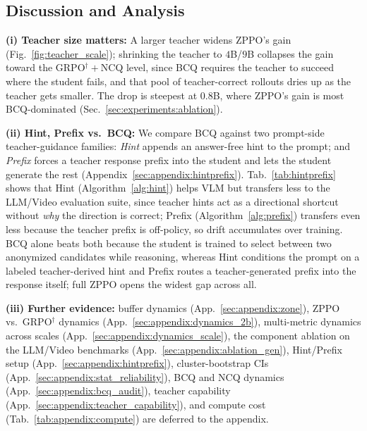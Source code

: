 \subsection{Discussion and Analysis}
\label{sec:experiments:discussion}

\textbf{(i) Teacher size matters:} A larger teacher widens ZPPO's gain (Fig.~\ref{fig:teacher_scale}); shrinking the teacher to $4$B/$9$B collapses the gain toward the GRPO$^{\dagger}\!+\!$NCQ level, since BCQ requires the teacher to succeed where the student fails, and that pool of teacher-correct rollouts dries up as the teacher gets smaller. The drop is steepest at $0.8$B, where ZPPO's gain is most BCQ-dominated (Sec.~\ref{sec:experiments:ablation}).

\textbf{(ii) Hint, Prefix vs.\ BCQ:} We compare BCQ against two prompt-side teacher-guidance families: \emph{Hint} appends an answer-free hint to the prompt; and \emph{Prefix} forces a teacher response prefix into the student and lets the student generate the rest (Appendix~\ref{sec:appendix:hintprefix}). Tab.~\ref{tab:hintprefix} shows that Hint (Algorithm~\ref{alg:hint}) helps VLM but transfers less to the LLM/Video evaluation suite, since teacher hints act as a directional shortcut without \emph{why} the direction is correct; Prefix (Algorithm~\ref{alg:prefix}) transfers even less because the teacher prefix is off-policy, so drift accumulates over training. BCQ alone beats both because the student is trained to select between two anonymized candidates while reasoning, whereas Hint conditions the prompt on a labeled teacher-derived hint and Prefix routes a teacher-generated prefix into the response itself; full ZPPO opens the widest gap across all.

\textbf{(iii) Further evidence:} buffer dynamics (App.~\ref{sec:appendix:zone}), ZPPO vs.\ GRPO$^{\dagger}$ dynamics (App.~\ref{sec:appendix:dynamics_2b}), multi-metric dynamics across scales (App.~\ref{sec:appendix:dynamics_scale}), the component ablation on the LLM/Video benchmarks (App.~\ref{sec:appendix:ablation_gen}), Hint/Prefix setup (App.~\ref{sec:appendix:hintprefix}), cluster-bootstrap CIs (App.~\ref{sec:appendix:stat_reliability}), BCQ and NCQ dynamics (App.~\ref{sec:appendix:bcq_audit}), teacher capability (App.~\ref{sec:appendix:teacher_capability}), and compute cost (Tab.~\ref{tab:appendix:compute}) are deferred to the appendix.

